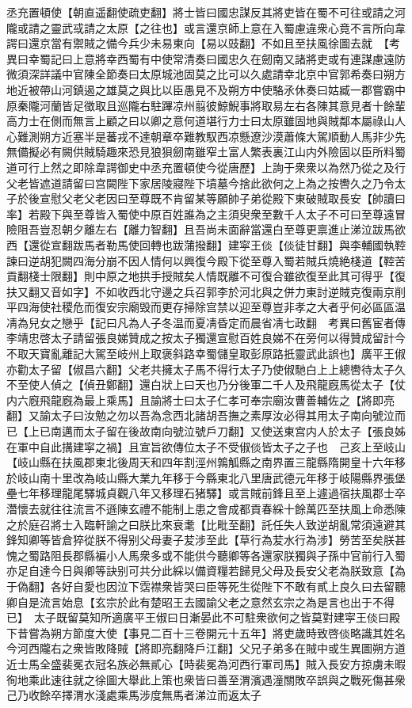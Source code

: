 丞充置頓使【朝直遥翻使疏吏翻】將士皆曰國忠謀反其將吏皆在蜀不可往或請之河隴或請之靈武㦯請之太原【之往也】或言還京師上意在入蜀慮違衆心竟不言所向韋諤曰還京當有禦賊之備今兵少未易東向【易以豉翻】不如且至扶風徐圖去就　【考異曰幸蜀記曰上意將幸西蜀有中使常清奏曰國忠久在劒南又諸將吏或有連謀慮遠防微須深詳議中官陳全節奏曰太原城池固莫之比可以久處請幸北京中官郭希奏曰朔方地近被帶山河鎮遏之雄莫之與比以臣愚見不及朔方中使駱氶休奏曰姑臧一郡嘗霸中原秦隴河蘭皆足徵取且巡隴右駐蹕凉州翦彼鯨鯢事將取易左右各陳其意見者十餘輩高力士在側而無言上顧之曰以卿之意何道堪行力士曰太原雖固地與賊鄰本屬祿山人心難測朔方近塞半是蕃戎不達朝章卒難教馭西凉懸遼沙漠蕭條大駕順動人馬非少先無備擬必有闕供賊騎趣來恐見狼狽劒南雖窄土富人繁表裏江山内外險固以臣所料蜀道可行上然之即除韋諤御史中丞充置頓使今從唐歷】上詢于衆衆以為然乃從之及行父老皆遮道請留曰宫闕陛下家居陵寢陛下墳墓今捨此欲何之上為之按轡久之乃令太子於後宣慰父老父老因曰至尊既不肯留某等願帥子弟從殿下東破賊取長安【帥讀曰率】若殿下與至尊皆入蜀使中原百姓誰為之主須臾衆至數千人太子不可曰至尊遠冒險阻吾豈忍朝夕離左右【離力智翻】且吾尚未面辭當還白至尊更禀進止涕泣跋馬欲西【還從宣翻跋馬者勒馬使回轉也跋蒲撥翻】建寜王倓【倓徒甘翻】與李輔國執鞚諫曰逆胡犯闕四海分崩不因人情何以興復今殿下從至尊入蜀若賊兵燒絶棧道【鞚苦貢翻棧士限翻】則中原之地拱手授賊矣人情既離不可復合雖欲復至此其可得乎【復扶又翻又音如字】不如收西北守邊之兵召郭李於河北與之併力東討逆賊克復兩京削平四海使社稷危而復安宗廟毁而更存掃除宫禁以迎至尊豈非孝之大者乎何必區區温凊為兒女之戀乎【記曰凡為人子冬温而夏凊昏定而晨省凊七政翻　考異曰舊宦者傳李靖忠啓太子請留張良娣贊成之按太子獨還宣慰百姓良娣不在旁何以得贊成留計今不取天寶亂離記大駕至岐州上取褒斜路幸蜀儲皇取彭原路扺靈武此誤也】廣平王俶亦勸太子留【俶昌六翻】父老共擁太子馬不得行太子乃使俶馳白上上總轡待太子久不至使人偵之【偵丑鄭翻】還白狀上曰天也乃分後軍二千人及飛龍廐馬從太子【仗内六廐飛龍廐為最上乘馬】且諭將士曰太子仁孝可奉宗廟汝曹善輔佐之【將即亮翻】又諭太子曰汝勉之勿以吾為念西北諸胡吾撫之素厚汝必得其用太子南向號泣而已【上已南邁而太子留在後故南向號泣號戶刀翻】又使送東宫内人於太子【張良姊在軍中自此搆建寜之禍】且宣旨欲傳位太子不受俶倓皆太子之子也　己亥上至岐山【岐山縣在扶風郡東北後周天和四年割涇州鶉觚縣之南界置三龍縣隋開皇十六年移於岐山南十里改為岐山縣大業九年移于今縣東北八里唐武德元年移于岐陽縣界張堡壘七年移理龍尾驛城貞觀八年又移理石猪驛】或言賊前鋒且至上遽過宿扶風郡士卒濳懷去就往往流言不遜陳玄禮不能制上患之會成都貢春綵十餘萬匹至扶風上命悉陳之於庭召將士入臨軒諭之曰朕比來衰耄【比毗至翻】託任失人致逆胡亂常須遠避其鋒知卿等皆倉猝從朕不得别父母妻子苃涉至此【草行為苃水行為涉】勞苦至矣朕甚愧之蜀路阻長郡縣褊小人馬衆多或不能供今聽卿等各還家朕獨與子孫中官前行入蜀亦足自達今日與卿等訣别可共分此綵以備資糧若歸見父母及長安父老為朕致意【為于偽翻】各好自愛也因泣下霑襟衆皆哭曰臣等死生從陛下不敢有貳上良久曰去留聽卿自是流言始息【玄宗於此有楚昭王去國諭父老之意然玄宗之為是言也出于不得已】　太子既留莫知所適廣平王俶曰日漸晏此不可駐衆欲何之皆莫對建寜王倓曰殿下昔嘗為朔方節度大使【事見二百十三卷開元十五年】將吏歲時致啓倓略識其姓名今河西隴右之衆皆敗降賊【將即亮翻降戶江翻】父兄子弟多在賊中或生異圖朔方道近士馬全盛裴冕衣冠名族必無貳心【時裴冕為河西行軍司馬】賊入長安方掠虜未暇徇地乘此速往就之徐圖大舉此上策也衆皆曰善至渭濱遇潼關敗卒誤與之戰死傷甚衆己乃收餘卒擇渭水淺處乘馬涉度無馬者涕泣而返太子